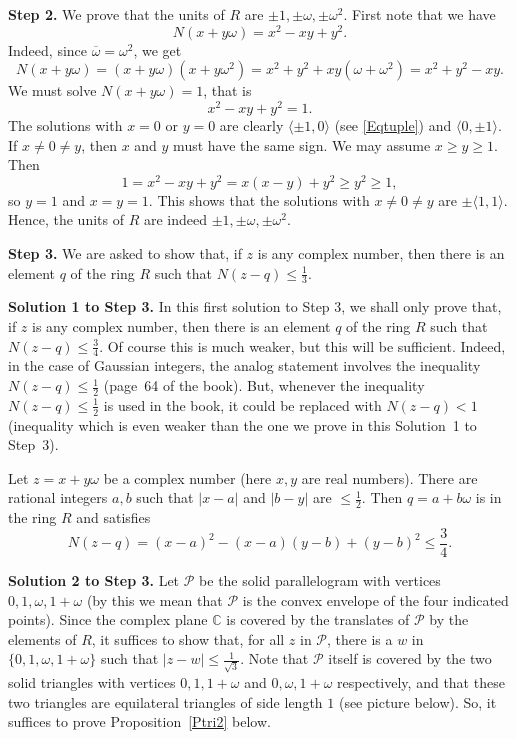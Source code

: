 \documentclass[12pt,letterpaper]{article}
\newcommand{\C}{\mathbb{C}}
\theoremstyle{definition}
\begin{document}
\noindent\textbf{Step 2.} We prove that the units of $R$ are $\pm 1,\pm\omega,\pm\omega^2$. First note that we have 
\begin{equation}\label{Eqnorm}
N(x+y\omega)=x^2-xy+y^2.
\end{equation}
Indeed, since $\overline{\omega}=\omega^2$, we get 
$$
N(x+y\omega)=(x+y\omega)(x+y\omega^2)=x^2+y^2+xy(\omega+\omega^2)=x^2+y^2-xy.
$$ 
We must solve $N(x+y\omega)=1$, that is
$$
x^2-xy+y^2=1.
$$ 
The solutions with $x=0$ or $y=0$ are clearly $\langle\pm1,0\rangle$ (see \eqref{Eqtuple}) and $\langle 0,\pm1\rangle$. If $x\ne0\ne y$, then $x$ and $y$ must have the same sign. We may assume $x\ge y\ge 1$. Then 
$$
1=x^2-xy+y^2=x(x-y)+y^2\ge y^2\ge 1,
$$ 
so $y=1$ and $x=y=1$. This shows that the solutions with $x\ne0\ne y$ are $\pm\langle1,1\rangle$. Hence, the units of $R$ are indeed $\pm 1,\pm\omega,\pm\omega^2$. 

\noindent\textbf{Step 3.} We are asked to show that, if $z$ is any complex number, then there is an element $q$ of the ring $R$ such that $N(z-q)\le\frac{1}{3}$. 

\noindent\textbf{Solution 1 to Step 3.} In this first solution to Step 3, we shall only prove that, if $z$ is any complex number, then there is an element $q$ of the ring $R$ such that $N(z-q)\le\frac{3}{4}$. Of course this is much weaker, but this will be sufficient. Indeed, in the case of Gaussian integers, the analog statement involves the inequality $N(z-q)\le\frac{1}{2}$ (page~64 of the book). But, whenever the inequality $N(z-q)\le\frac{1}{2}$ is used in the book, it could be replaced with $N(z-q) < 1$ (inequality which is even weaker than the one we prove in this Solution~1 to Step~3). 

Let $z=x+y\omega$ be a complex number (here $x,y$ are real numbers). There are rational integers $a,b$ such that $|x-a|$ and $|b-y|$ are $\le\frac{1}{2}$. Then $q=a+b\omega$ is in the ring $R$ and satisfies 
$$
N(z-q)=(x-a)^2-(x-a)(y-b)+(y-b)^2\le\frac{3}{4}.
$$ 

\noindent\textbf{Solution 2 to Step 3.} Let $\mathcal{P}$ be the solid parallelogram with vertices $0, 1, \omega, 1+\omega$ (by this we mean that $\mathcal{P}$ is the convex envelope of the four indicated points). Since the complex plane $\C$ is covered by the translates of $\mathcal{P}$ by the elements of $R$, it suffices to show that, for all $z$ in $\mathcal{P}$, there is a $w$ in $\{0, 1, \omega, 1+\omega\}$ such that $|z-w|\le \frac{1}{\sqrt{3}}$. Note that $\mathcal{P}$ itself is covered by the two solid triangles with vertices $0, 1, 1+\omega$ and $0, \omega, 1+\omega$ respectively, and that these two triangles are equilateral triangles of side length $1$ (see picture below). So, it suffices to prove Proposition~\ref{Ptri2} below. 
\end{document}
